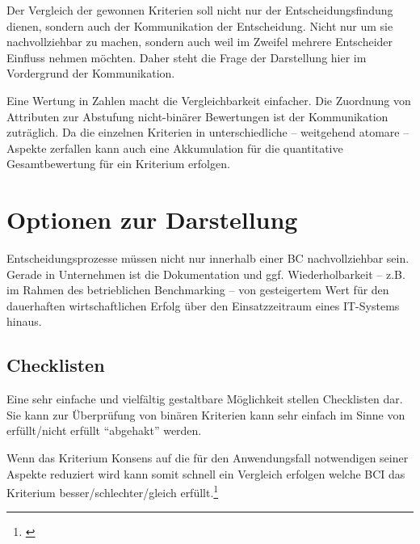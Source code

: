 

Der Vergleich der gewonnen Kriterien soll nicht nur der Entscheidungsfindung dienen, sondern auch der Kommunikation der Entscheidung.
Nicht nur um sie nachvollziehbar zu machen, sondern auch weil im Zweifel mehrere Entscheider Einfluss nehmen möchten.
Daher steht die Frage der Darstellung hier im Vordergrund der Kommunikation.

Eine Wertung in Zahlen macht die Vergleichbarkeit einfacher.
Die Zuordnung von Attributen zur Abstufung nicht-binärer Bewertungen ist der Kommunikation zuträglich.
Da die einzelnen Kriterien in unterschiedliche -- weitgehend atomare -- Aspekte zerfallen kann auch eine Akkumulation für die quantitative Gesamtbewertung für ein Kriterium erfolgen.


\section{Optionen zur Darstellung}\label{depiction}

Entscheidungsprozesse müssen nicht nur innerhalb einer \gls{BC} nachvollziehbar sein.
Gerade in Unternehmen ist die Dokumentation und ggf. Wiederholbarkeit -- z.B. im Rahmen des betrieblichen Benchmarking -- von gesteigertem Wert für den dauerhaften wirtschaftlichen Erfolg über den Einsatzzeitraum eines IT-Systems hinaus.

\subsection{Checklisten}

Eine sehr einfache und vielfältig gestaltbare Möglichkeit stellen Checklisten dar.
Sie kann zur Überprüfung von binären Kriterien kann sehr einfach im Sinne von erfüllt/nicht erfüllt \enquote{abgehakt} werden.

Wenn das Kriterium Konsens auf die für den Anwendungsfall notwendigen seiner Aspekte reduziert wird kann somit schnell ein Vergleich erfolgen welche \gls{BCI} das Kriterium besser/schlechter/gleich erfüllt.\footnote{\cite{TN_libero_mab215408815}}

